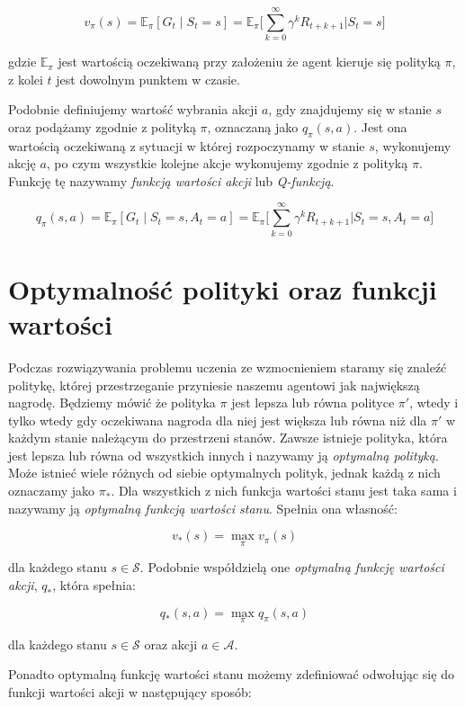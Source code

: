 \documentclass[licencjacka]{pracamgr}
\begin{document}
$$ v_{\pi}(s) = \mathbb{E}_{\pi}[G_t \mid S_t = s] = \mathbb{E}_{\pi} \Bigg[ \sum_{k=0}^{\infty} \gamma^k R_{t+k+1} \bigg| S_t = s \Bigg] $$

gdzie $ \mathbb{E}_{\pi} $ jest wartością oczekiwaną przy założeniu że agent kieruje się polityką $\pi$, z kolei $t$ jest dowolnym punktem w czasie. 

Podobnie definiujemy wartość wybrania akcji $a$, gdy znajdujemy się w stanie $s$ oraz podążamy zgodnie z polityką $\pi$, oznaczaną jako $q_{\pi}(s, a)$. Jest ona wartością oczekiwaną z sytuacji w której rozpoczynamy w stanie $s$, wykonujemy akcję $a$, po czym wszystkie kolejne akcje wykonujemy zgodnie z polityką $\pi$. Funkcję tę nazywamy \emph{funkcją wartości akcji} lub \emph{Q-funkcją}.

$$ q_{\pi}(s, a) = \mathbb{E}_{\pi}[G_t \mid S_t = s, A_t = a] = \mathbb{E}_{\pi} \Bigg[ \sum_{k=0}^{\infty} \gamma^k R_{t+k+1} \bigg| S_t = s, A_t = a \Bigg] $$

\section{Optymalność polityki oraz funkcji wartości}

Podczas rozwiązywania problemu uczenia ze wzmocnieniem staramy się znaleźć politykę, której przestrzeganie przyniesie naszemu agentowi jak największą nagrodę. Będziemy mówić że polityka $\pi$ jest lepsza lub równa polityce $\pi'$, wtedy i tylko wtedy gdy oczekiwana nagroda dla niej jest większa lub równa niż dla $\pi'$ w każdym stanie należącym do przestrzeni stanów. Zawsze istnieje polityka, która jest lepsza lub równa od wszystkich innych i nazywamy ją \emph{optymalną polityką}. Może istnieć wiele różnych od siebie optymalnych polityk, jednak każdą z nich oznaczamy jako $\pi_{\ast}$. Dla wszystkich z nich funkcja wartości stanu jest taka sama i nazywamy ją \emph{optymalną funkcją wartości stanu}. Spełnia ona własność:

$$ v_{\ast}(s) = \max_{\pi} v_{\pi}(s) $$

dla każdego stanu $s \in \mathcal{S}$. Podobnie współdzielą one \emph{optymalną funkcję wartości akcji}, $q_{\ast}$, która spełnia:

$$ q_{\ast}(s, a) = \max_{\pi} q_{\pi}(s, a) $$

dla każdego stanu $s \in \mathcal{S}$ oraz akcji $a \in \mathcal{A}$.

Ponadto optymalną funkcję wartości stanu możemy zdefiniować odwołując się do funkcji wartości akcji w następujący sposób:
\end{document}
